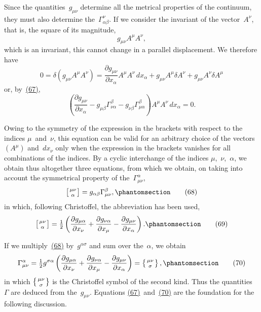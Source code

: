 \documentclass[12pt]{book}[2005/09/16]
\newcommand{\Change}[2]{#2}
\newcommand{\Add}[1]{\Change{}{#1}}
\newcommand{\PageSep}[1]{\ignorespaces}
\newcommand{\Tag}[1]{%
  \phantomsection
  \label{eqn:#1}
  \tag*{#1}
}
\newcommand{\Eqref}[1]{\hyperref[eqn:#1]{#1}}
\newcommand{\dd}{\partial}
\newcommand{\Chr}[3]{\vphantom{\big|}\smash{\genfrac{}{}{0pt}{1}{#1#2}{#3}}}
\begin{document}
Since the quantities~$g_{\mu\nu}$ determine all the metrical
properties of the continuum, they must also determine
the~$\Gamma_{\alpha\beta}^{\nu}$. If we consider the invariant of the vector~$A^{\nu}$,
that is, the square of its magnitude,
\[
g_{\mu\nu} A^{\mu} A^{\nu}\Add{,}
\]
which is an invariant, this cannot change in a parallel
displacement. We therefore have
\[
0 = \delta(g_{\mu\nu} A^{\mu} A^{\nu})
  = \frac{\dd g_{\mu\nu}}{\dd x_{\alpha}} A^{\mu} A^{\nu}\, dx_{\alpha}
  + g_{\mu\nu} A^{\mu} \delta A^{\nu} + g_{\mu\nu} A^{\nu} \delta A^{\mu}
\]
or, by~\Eqref{(67)},
\[
\left(\frac{\dd g_{\mu\nu}}{\dd x_{\alpha}}
  - g_{\mu\beta} \Gamma_{\nu\alpha}^{\beta}
  - g_{\nu\beta} \Gamma_{\mu\alpha}^{\beta}\right) A^{\mu} A^{\nu}\, dx_{\alpha}
= 0.
\]
\PageSep{79}

Owing to the symmetry of the expression in the
brackets with respect to the indices $\mu$~and~$\nu$, this equation
can be valid for an arbitrary choice of the vectors $(A^{\mu})$
and~$dx_{\nu}$ only when the expression in the brackets vanishes
for all combinations of the indices. By a cyclic interchange
of the indices $\mu$,~$\nu$,~$\alpha$, we obtain thus altogether
three equations, from which we obtain, on taking into
account the symmetrical property of the~$\Gamma_{\mu\nu}^{\alpha}$,
\[
\left[\Chr{\mu}{\nu}{\alpha}\right]
  = g_{\alpha\beta} \Gamma_{\mu\nu}^{\beta}\Add{,}
\Tag{(68)}
\]
in which, following Christoffel, the abbreviation has been
used,
\[
\left[\Chr{\mu}{\nu}{\alpha}\right]
  = \tfrac{1}{2}\left(
    \frac{\dd g_{\mu\alpha}}{\dd x_{\nu}}
  + \frac{\dd g_{\nu\alpha}}{\dd x_{\mu}}
  - \frac{\dd g_{\mu\nu}}{\dd x_{\alpha}}
\right)\Add{.}
\Tag{(69)}
\]

If we multiply~\Eqref{(68)} by~$g^{\alpha\sigma}$ and sum over the~$\alpha$, we
obtain
\[
\Gamma_{\mu\nu}^{\alpha}
  = \tfrac{1}{2} g^{\sigma\alpha}\left(
    \frac{\dd g_{\mu\alpha}}{\dd x_{\nu}}
  + \frac{\dd g_{\nu\alpha}}{\dd x_{\mu}}
  - \frac{\dd g_{\mu\nu}}{\dd x_{\alpha}}
\right) = \left\{\Chr{\mu}{\nu}{\sigma}\right\}\Add{,}
\Tag{(70)}
\]
in which $\left\{\Chr{\mu}{\nu}{\sigma}\right\}$ is the Christoffel symbol of the second
kind. Thus the quantities~$\Gamma$ are deduced from the~$g_{\mu\nu}$.
Equations \Eqref{(67)}~and~\Eqref{(70)} are the foundation for the
following discussion.
\end{document}
